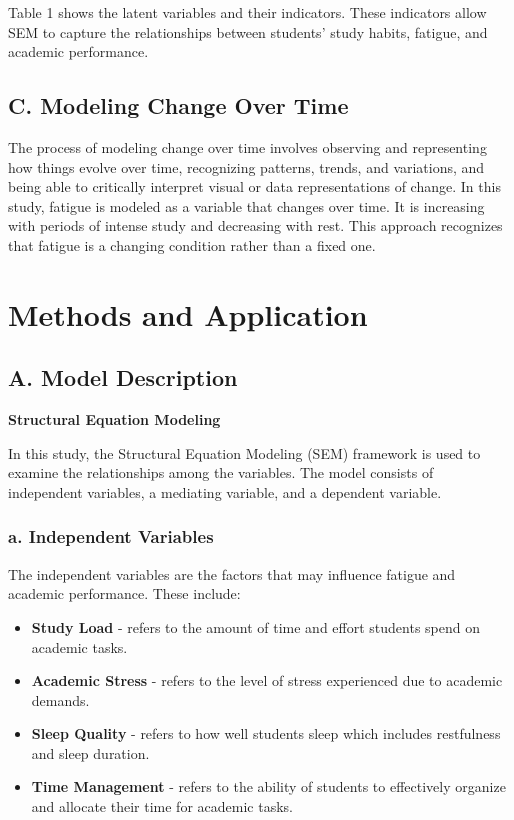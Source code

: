 \documentclass [12pt]{article}
\begin{document}
Table 1 shows the latent variables and their indicators. These indicators allow SEM to capture the relationships between students’ study habits, fatigue, and academic performance. 

\subsection*{C. Modeling Change Over Time}

The process of modeling change over time involves observing and representing how things evolve over time, recognizing patterns, trends, and variations, and being able to critically interpret visual or data representations of change. In this study, fatigue is modeled as a variable that changes over time. It is increasing with periods of intense study and decreasing with rest. This approach recognizes that fatigue is a changing condition rather than a fixed one. 

\section*{Methods and Application}

\subsection*{A. Model Description}

\noindent\textbf{Structural Equation Modeling}

In this study, the Structural Equation Modeling (SEM) framework is used to examine the relationships among the variables. The model consists of independent variables, a mediating variable, and a dependent variable. 

\subsubsection*{a. Independent Variables}

The independent variables are the factors that may influence fatigue and academic performance. These include: 

\begin{itemize}
    \item \textbf{Study Load} - refers to the amount of time and effort students spend on academic tasks. 
    \item \textbf{Academic Stress} - refers to the level of stress experienced due to academic demands.
    \item \textbf{Sleep Quality} - refers to how well students sleep which includes restfulness and sleep duration.
    \item \textbf{Time Management} - refers to the ability of students to effectively organize and allocate their time for academic tasks.
\end{itemize}
\end{document}
